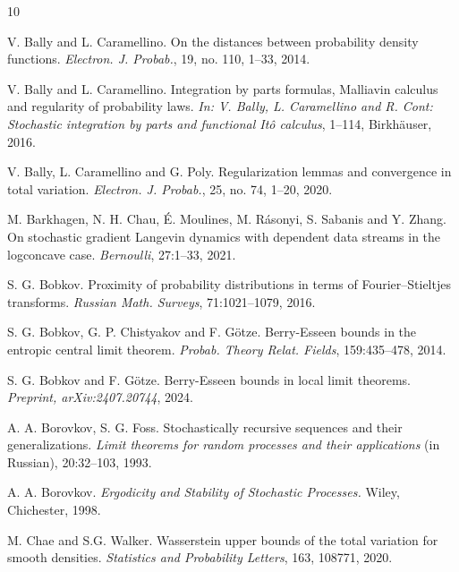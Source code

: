 \documentclass{article}
\begin{document}
\begin{thebibliography}{10}





V. Bally and L. Caramellino.
\newblock On the distances between probability density functions. 
\newblock \emph{Electron.
J. Probab.}, 19, no. 110, 1--33, 2014.

 V. Bally and L. Caramellino.
\newblock Integration by parts formulas, Malliavin calculus and
regularity of probability laws.
\newblock \emph{In: V. Bally, L. Caramellino and R. Cont: Stochastic integration
by parts and functional It\^{o} calculus}, 1--114, Birkh\"auser, 2016.

 V. Bally, L. Caramellino and G. Poly.
\newblock Regularization lemmas and convergence in total variation. 
\newblock \emph{Electron.
J. Probab.}, 25, no. 74, 1--20, 2020.

 M. Barkhagen, N. H. Chau, \'E. Moulines, M. R\'asonyi, S. Sabanis and Y. Zhang.
\newblock On stochastic gradient Langevin dynamics with dependent data streams in the logconcave case.
\newblock \emph{Bernoulli}, 27:1--33, 2021.

S. G. Bobkov.
\newblock Proximity of probability distributions
in terms of Fourier--Stieltjes transforms.
\newblock \emph{Russian Math. Surveys}, 71:1021--1079, 2016.

S. G. Bobkov, G. P. Chistyakov and F. G\"otze. 
\newblock Berry-Esseen bounds in the entropic central limit theorem. 
\newblock \emph{Probab. Theory Relat. Fields}, 159:435--478, 2014.

S. G. Bobkov and F. G\"otze.
\newblock Berry-Esseen bounds in local limit theorems.
\newblock \emph{Preprint, arXiv:2407.20744}, 2024.

A. A. Borovkov, S. G. Foss. \newblock Stochastically recursive sequences and their
generalizations. \newblock \emph{Limit theorems for random processes and their applications} (in Russian), 
20:32--103, 1993.
 

 A. A. Borovkov. 
\newblock \emph{Ergodicity and Stability of Stochastic Processes.}
\newblock Wiley, Chichester, 1998. 

 M. Chae and S.G. Walker. 
\newblock Wasserstein upper bounds of the total variation for smooth densities.
\newblock \emph{Statistics and Probability Letters}, 163, 108771, 2020.



\end{thebibliography}
\end{document}
